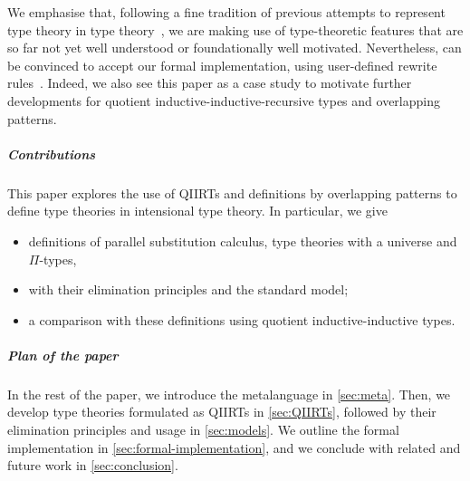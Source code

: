 \documentclass[a4paper,UKenglish,numberwithinsect,cleveref,thm-restate]{lipics-v2021}
\begin{document}

%
We emphasise that, following a fine tradition of previous attempts to represent type theory in type theory~\cite{Danielsson2006,Chapman2009,Altenkirch2016a}, we are making use of type-theoretic features that are so far not yet well understood or foundationally well motivated.
Nevertheless, \Agda can be convinced to accept our formal implementation, using user-defined rewrite rules~\cite{Cockx2020,Cockx2021}.
Indeed, we also see this paper as a case study to motivate further developments for quotient inductive-inductive-recursive types and overlapping patterns.

\subparagraph*{Contributions}
This paper explores the use of QIIRTs and definitions by overlapping patterns to define type theories in intensional type theory.
In particular, we give
\begin{itemize}
  \item definitions of parallel substitution calculus, type theories with a universe and $\Pi$-types,
  \item with their elimination principles and the standard model;
  \item a comparison with these definitions using quotient inductive-inductive types.
\end{itemize}

\subparagraph*{Plan of the paper}
In the rest of the paper, we introduce the metalanguage in \cref{sec:meta}.
Then, we develop type theories formulated as QIIRTs in \cref{sec:QIIRTs}, followed by their elimination principles and usage in \cref{sec:models}.
We outline the \Agda formal implementation in \cref{sec:formal-implementation}, and we conclude with related and future work in \cref{sec:conclusion}.
\end{document}

